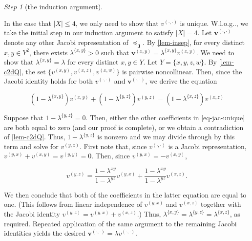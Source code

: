 \documentclass[ecta,nameyear,draft]{econsocart}
\makeatletter
\newcommand{\mbbj}{\mathbf J}
\newcommand{\xy}{{(x, y)}}
\newcommand{\yx}{{(y, x)}}
\newcommand{\yz}{{(y,z)}}
\newcommand{\xz}{{(x,z)}}
\newcommand{\xw}{{(x,w)}}
\newcommand{\dd}{{(\cdot,\cdot)}}
\newcommand\Wlog{W\@.l\@.o\@.g\@ifnextchar.{}{.\@}}
\theoremstyle{plain}
\theoremstyle{remark}
\newtheorem{step}{Step}[section]
\makeatother
\begin{document}
\begin{appendix}
\begin{step}[the induction argument]
\begin{proofEnd}
    In the case that $\lvert X \rvert \leq 4$, we only need to show that $v^{
      \dd}$ is unique. \Wlog, we take the initial step in our induction argument
    to satisfy $\lvert X \rvert = 4$.  Let $\mathbf v^{\dd}$ denote any other
    Jacobi representation of $\preceq_{\mbbj}$. By \cref{lem-insep}, for every
    distinct $x , y \in Y^{2}$, there exists $\lambda^{\{x,y\}}> 0$ such that
    $\mathbf v^{\xy} = \lambda^{\{x,y\}} v^{\xy}$. We need to show that
    $\lambda^{\{x,y\}} = \lambda$ for every distinct $x , y \in Y$.  Let $Y = \{
      x , y , z , w \}$.  By \cref{lem-c2dQ}, the set $\{v^{\xy} , v^{\xz}
    , v^{\xw} \}$ is pairwise noncollinear. Then, since the Jacobi identity
    holds for both $v^{\dd}$ and $\mathbf v^{\dd}$, we derive the equation
  \begin{linenomath*}
    \begin{equation}\label{eq-jac-unique}
      (1 - \lambda^{\{x,y\}})v^{\xy} + (1 - \lambda^{\{y,z\}})v^{\yz} =
      (1 - \lambda^{\{x,z\}}) v^{\xz}
    \end{equation}
  \end{linenomath*}
  Suppose that $1 - \lambda^{\{y,z\}} = 0$. Then, either the other coefficients
    in \cref{eq-jac-unique} are both equal to zero (and our proof is complete),
    or we obtain a contradiction of \cref{lem-c2dQ}.  Thus, $1 - \lambda
   ^{\{y,z\}}$ is nonzero and we may divide through by this term and solve for
    $v^{\yz}$. First note that, since $v^{\dd}$ is a Jacobi representation,
    $v^{\yx}+ v^{\xy} = v^{(y,y)} = 0$. Then, since $v^{\yx} = - v^{
      \xy}$, 
  \begin{linenomath*}
    \begin{equation*}
      v^{\yz} = \frac{1- \lambda^{x y}}{1 - \lambda^{y z}} v^{\yx} +
      \frac{1 - \lambda^{x y}}{1 - \lambda^{y z}} v^{\xz}.
    \end{equation*}
    \end{linenomath*}
  We then conclude that both of the coefficients in the latter equation are equal
    to one. (This follows from linear independence of $v^{\yx}$ and $v^{\xz
   }$ together with the Jacobi identity $v^{\yz} = v^{\yx} + v^{\xz}$.)
    Thus, $\lambda^{\{x,y\}} = \lambda^{\{y,z\}} = \lambda^{\{x,z\}}$, as
    required. Repeated application of the same argument to the remaining Jacobi
    identities yields the desired $\mathbf v^{\dd}= \lambda v^{\dd}$.
  

\end{proofEnd}
\end{step}
\end{appendix}
\end{document}
